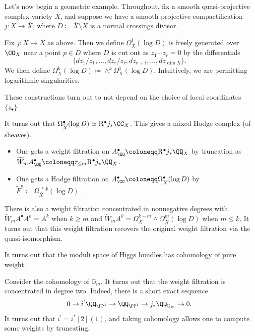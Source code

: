 \documentclass{article}
\begin{document}
Let's now begin a geometric example. Throughout, fix a smooth quasi-projective complex variety $X$, and suppose we have a smooth projective compactification $j\colon X\to\overline X$, where $D\coloneqq\overline X\setminus X$ is a normal crossings divisor.
\begin{definition}
	Fix $j\colon X\to\overline X$ as above. Then we define $\Omega^1_{\overline X}(\log D)$ is freely generated over $\OO_X$ near a point $p\in D$ where $D$ is cut out as $z_1\cdots z_r=0$ by the differentials
	\[\{dz_1/z_1,\ldots,dz_r/z_r,dz_{r+1},\ldots,dz_{\dim X}\}.\]
	We then define $\Omega^k_{\overline X}(\log D)\coloneqq\land^k\Omega^1_{\overline X}(\log D)$. Intuitively, we are permitting logarithmic singularities.
\end{definition}
\begin{remark}
	These constructions turn out to not depend on the choice of local coordinates $\{z_\bullet\}$ 
\end{remark}
\begin{example}
	It turns out that $\Omega^\bullet_{\overline X}(\log D)\simeq\mathrm R^\bullet j_*\CC_X$. This gives a mixed Hodge complex (of sheaves).
	\begin{itemize}
		\item One gets a weight filtration on $A^\bullet_\QQ\coloneqq\mathrm R^\bullet j_*\QQ_X$ by truncation as $\widetilde W_mA^\bullet_\QQ\coloneqq\tau_{\le m}\mathrm R^\bullet j_*\QQ_X$.
		\item One gets a Hodge filtration on $A^\bullet_\CC\coloneqq\Omega^\bullet_{\overline X}(\log D)$ by $\widetilde F^p\coloneqq\Omega^{\ge p}_{\overline X}(\log D)$.
	\end{itemize}
	There is also a weight filtration concentrated in nonnegative degrees with $\widetilde W_mA^\bullet A^k=A^k$ when $k\ge m$ and $\widetilde W_mA^k=\Omega_{\overline X}^{k-m}\land\Omega_{\overline X}^m(\log D)$ when $m\le k$. It turns out that this weight filtration recovers the original weight filtration via the quasi-isomorphism.
\end{example}
\begin{example}
	It turns out that the moduli space of Higgs bundles has cohomology of pure weight.
\end{example}
\begin{example}
	Consider the cohomology of $\mathbb G_m$. It turns out that the weight filtration is concentrated in degree two. Indeed, there is a short exact sequence
	\[0\to i^!\QQ_{\PP^1}\to\QQ_{\PP^1}\to j_*\QQ_{\mathbb G_m}\to0.\]
	It turns out that $i^!=i^*[2](1)$, and taking cohomology allows one to compute some weights by truncating.
\end{example}
\end{document}
